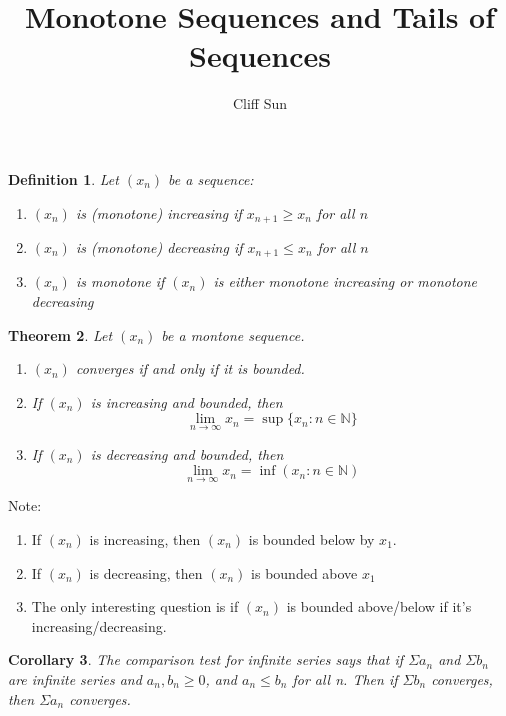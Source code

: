 \documentclass{article}
\title{Monotone Sequences and Tails of Sequences}
\author{Cliff Sun}
\newtheorem{theorem}{Theorem}[section]
\newtheorem{definition}[theorem]{Definition}
\newtheorem{corollary}[theorem]{Corollary}
\newtheorem{one minute paper}[theorem]{One Minute Paper}
\begin{document}
\maketitle

\begin{definition}
    Let $(x_n)$ be a sequence:
    \begin{enumerate}
        \item $(x_n)$ is (monotone) increasing if $x_{n+1} \geq x_n$ for all $n$
        \item $(x_n)$ is (monotone) decreasing if $x_{n+1} \leq x_n$ for all $n$
        \item $(x_n)$ is monotone if $(x_n)$ is either monotone increasing or monotone decreasing
    \end{enumerate}
\end{definition}

\begin{theorem}
    Let $(x_n)$ be a montone sequence. 
    \begin{enumerate}
        \item $(x_n)$ converges if and only if it is bounded.
        \item If $(x_n)$ is increasing and bounded, then 
        \begin{equation}
            \lim_{n \rightarrow \infty}x_n = \sup\{x_n : n \in \mathbb{N}\}
        \end{equation}
        \item If $(x_n)$ is decreasing and bounded, then 
        \begin{equation}
            \lim_{n\rightarrow\infty}x_n = \inf(x_n : n \in \mathbb{N})
        \end{equation}
    \end{enumerate}
\end{theorem}

Note:
\begin{enumerate}
    \item If $(x_n)$ is increasing, then $(x_n)$ is bounded below by $x_1$.
    \item If $(x_n)$ is decreasing, then $(x_n)$ is bounded above $x_1$
    \item The only interesting question is if $(x_n)$ is bounded above/below if it's increasing/decreasing. 
\end{enumerate}

\begin{corollary}
    The comparison test for infinite series says that if $\Sigma a_n$ and $\Sigma b_n$ are infinite series and $a_n, b_n \geq 0$, and $a_n \leq b_n$ for all n.
    Then if $\Sigma b_n$ converges, then $\Sigma a_n$ converges. 
\end{corollary}
\end{document}

